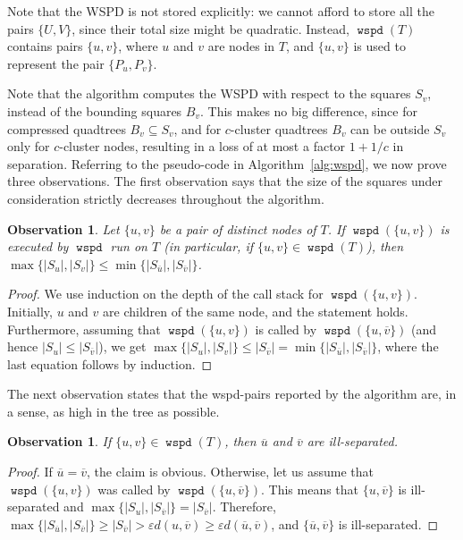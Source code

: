 \documentclass[11pt]{paper}
\newcommand {\eps} {\varepsilon}
\DeclareMathOperator {\wspd}{\texttt{wspd}}
\newcommand {\parent} {\overline}
\newtheorem {observation}[theorem] {Observation}
\begin{document}
    Note that the WSPD is not stored explicitly: we cannot afford to
    store all the pairs $\{U,V\}$, since their total size might be
    quadratic. Instead, $\wspd(T)$ contains pairs $\{u,v\}$, where $u$
    and $v$ are nodes in $T$, and $\{u,v\}$  is used to represent
    the pair $\{P_u, P_v\}$. 



    Note that the algorithm computes the WSPD with respect to the squares
    $S_v$, instead of the bounding squares $B_v$. This makes no big difference,
    since for compressed quadtrees $B_v \subseteq S_v$, and for
    $c$-cluster quadtrees $B_v$ can be outside $S_v$ only for
    $c$-cluster nodes, resulting in a loss of at most a factor $1+1/c$
    in separation. 
    Referring to the pseudo-code in Algorithm~\ref{alg:wspd}, 
    we now prove three observations. The first observation says
    that the size of the squares under consideration strictly 
    decreases throughout the algorithm.

    \begin{observation} \label{obs:parents-bigger}
    Let $\{u,v\}$ be a pair of distinct nodes of $T$. If 
    \emph{$\wspd(\{u, v\})$}
    is executed by \emph{$\wspd$} run
    on $T$ (in particular, if \emph{$\{u,v\} \in \wspd(T)$}),
    then $\max\{|S_u|, |S_v| \} \leq \min \{|S_{\parent u}|, |S_{\parent v}|\}$.
    \end{observation}


    \begin{proof}
    We use induction on the depth of the call stack for
    $\wspd(\{u,v\})$. Initially, $u$ and $v$ are children 
    of the same node, and the statement holds.
    Furthermore, assuming that $\wspd(\{u,v\})$ is called by
    $\wspd(\{u, \parent v\})$ (and hence $|S_u| \leq |S_{\parent v}|$), we get
    $\max\{|S_u|,|S_v|\} \leq |S_{\parent v}| =
    \min\{|S_{\parent u}|, |S_{\parent v}|\}$,
    where the last equation follows by induction.
    \end{proof}

    The next observation states that the wspd-pairs reported by the
    algorithm are, in a sense, as high in the tree as possible.
    \begin{observation}\label{obs:parents-not-ws}
    If \emph{$\{u, v\} \in \wspd(T)$},
    then $\parent u$ and $\parent v$ are ill-separated.
    \end{observation}

    \begin{proof}
    If $\parent u = \parent v$, the claim is obvious. Otherwise, let us assume
    that $\wspd(\{u,v\})$ was  called by $\wspd(\{u, \parent v\})$. This means
    that $\{u, \parent v\}$ is ill-separated and
    $\max\{|S_u|, |S_{\parent v}|\} = |S_{\parent v}|$.
    Therefore, 
    $ \max\{|S_{\parent u}|, |S_{\parent v}|\} \geq |S_{\parent v}| >
    \eps d(u,\parent v) \geq \eps d(\parent u, \parent v) $,  and $\{\parent u, \parent v\}$ is ill-separated.
    \end{proof}
\end{document}
